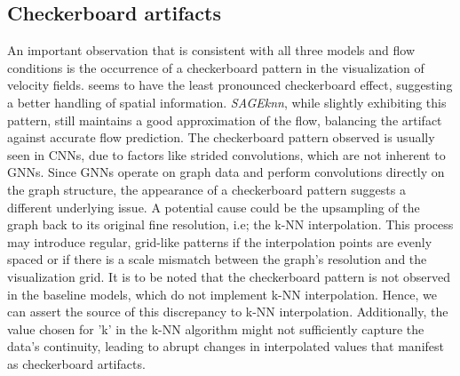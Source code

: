 \subsection{Checkerboard artifacts}
An important observation that is consistent with all three models and flow conditions is the occurrence of a checkerboard pattern in the visualization of velocity fields.  seems to have the least pronounced checkerboard effect, suggesting a better handling of spatial information. \textit{SAGEknn}, while slightly exhibiting this pattern, still maintains a good approximation of the flow, balancing the artifact against accurate flow prediction. The checkerboard pattern observed is usually seen in CNNs, due to factors like strided convolutions, which are not inherent to GNNs. Since GNNs operate on graph data and perform convolutions directly on the graph structure, the appearance of a checkerboard pattern suggests a different underlying issue. A potential cause could be the upsampling of the graph back to its original fine resolution, i.e; the k-NN interpolation. This process may introduce regular, grid-like patterns if the interpolation points are evenly spaced or if there is a scale mismatch between the graph's resolution and the visualization grid. It is to be noted that the checkerboard pattern is not observed in the baseline models, which do not implement k-NN interpolation. Hence, we can assert the source of this discrepancy to k-NN interpolation. Additionally, the value chosen for 'k' in the k-NN algorithm might not sufficiently capture the data's continuity, leading to abrupt changes in interpolated values that manifest as checkerboard artifacts. \\

